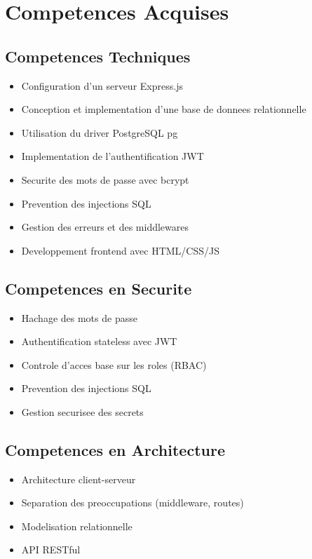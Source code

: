 \documentclass[a4paper,12pt]{book}
\begin{document}
\section{Competences Acquises}

\subsection{Competences Techniques}

\begin{itemize}
    \item Configuration d'un serveur Express.js
    \item Conception et implementation d'une base de donnees relationnelle
    \item Utilisation du driver PostgreSQL pg
    \item Implementation de l'authentification JWT
    \item Securite des mots de passe avec bcrypt
    \item Prevention des injections SQL
    \item Gestion des erreurs et des middlewares
    \item Developpement frontend avec HTML/CSS/JS
\end{itemize}

\subsection{Competences en Securite}

\begin{itemize}
    \item Hachage des mots de passe
    \item Authentification stateless avec JWT
    \item Controle d'acces base sur les roles (RBAC)
    \item Prevention des injections SQL
    \item Gestion securisee des secrets
\end{itemize}

\subsection{Competences en Architecture}

\begin{itemize}
    \item Architecture client-serveur
    \item Separation des preoccupations (middleware, routes)
    \item Modelisation relationnelle
    \item API RESTful
\end{itemize}
\end{document}
